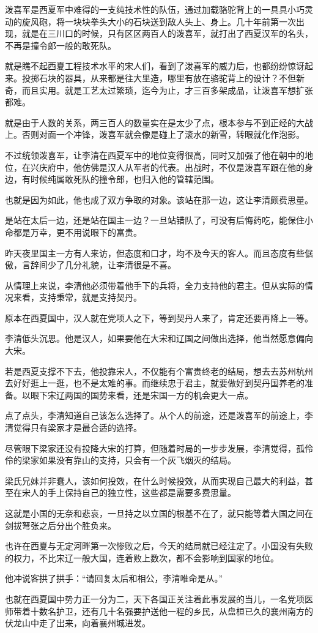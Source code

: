 泼喜军是西夏军中难得的一支纯技术性的队伍，通过加载骆驼背上的一具具小巧灵动的旋风砲，将一块块拳头大小的石块送到敌人头上、身上。几十年前第一次出现，就是在三川口的时候，只有区区两百人的泼喜军，就打出了西夏汉军的名头，不再是撞令郎一般的敢死队。

就是瞧不起西夏工程技术水平的宋人们，看到了泼喜军的威力后，也都纷纷惊讶起来。投掷石块的器具，从来都是往大里造，哪里有放在骆驼背上的设计？不但新奇，而且实用。就是工艺太过繁琐，迄今为止，才三百多架成品，让泼喜军想扩张都难。

就是由于人数的关系，两三百人的数量实在是太少了点，根本参与不到正经的大战上。否则对面一个冲锋，泼喜军就会像是碰上了滚水的新雪，转眼就化作泡影。

不过统领泼喜军，让李清在西夏军中的地位变得很高，同时又加强了他在朝中的地位，在兴庆府中，他仿佛是汉人从军者的代表。出战时，不仅是泼喜军跟在他的身边，有时候纯属敢死队的撞令郎，也归入他的管辖范围。

也就是因为如此，他也成了双方争取的对象。该站在那一边，这让李清颇费思量。

是站在太后一边，还是站在国主一边？一旦站错队了，可没有后悔药吃，能保住小命都是万幸，更不用说眼下的富贵。

昨天夜里国主一方有人来访，但态度和口才，均不及今天的客人。而且态度有些倨傲，言辞间少了几分礼貌，让李清很是不喜。

从情理上来说，李清他必须带着他手下的兵将，全力支持他的君主。但从实际的情况来看，支持秉常，就是支持契丹。

原本在西夏国中，汉人就在党项人之下，等到契丹人来了，肯定还要再降上一等。

李清低头沉思。他是汉人，如果要他在大宋和辽国之间做出选择，他当然愿意偏向大宋。

若是西夏支撑不下去，他投靠宋人，不仅能有个富贵终老的结局，想去去苏州杭州去好好逛上一逛，也不是太难的事。而继续忠于君主，就要做好到契丹国养老的准备。以眼下宋辽两国的国势来看，还是宋国一方的机会更大一点。

点了点头，李清知道自己该怎么选择了。从个人的前途，还是泼喜军的前途上，李清觉得只有梁家才是最合适的选择。

尽管眼下梁家还没有投降大宋的打算，但随着时局的一步步发展，李清觉得，孤伶伶的梁家如果没有靠山的支持，只会有一个灰飞烟灭的结局。

梁氏兄妹并非蠢人，该如何投效，在什么时候投效，从而实现自己最大的利益，甚至在宋人的手上保持自己的独立性，这些都是需要多费思量。

这就是小国的无奈和悲哀，一旦持之以立国的根基不在了，就只能等着大国之间在剑拔弩张之后分出个胜负来。

也许在西夏与无定河畔第一次惨败之后，今天的结局就已经注定了。小国没有失败的权力，不比宋辽一般大国，连着败上数次，都不会影响到国家的地位。

他冲说客拱了拱手：“请回复太后和相公，李清唯命是从。”

也就在西夏国中势力正一分为二，天下各国正关注着此事发展的当儿，一名党项医师带着十数名护卫，还有几十名强要护送他一程的乡民，从盘桓已久的襄州南方的伏龙山中走了出来，向着襄州城进发。

